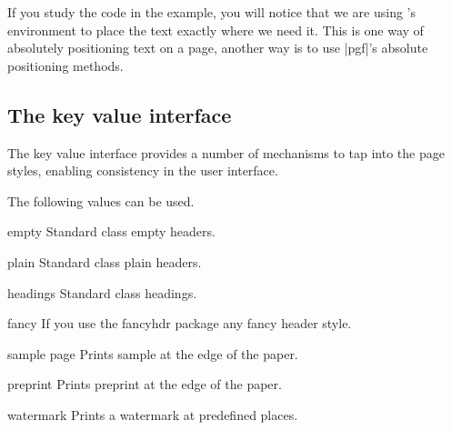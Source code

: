 If you study the code in the example, you will notice that we are using \LaTeXe's  environment to
place the text exactly where we need it. This is one way of absolutely positioning text on a page, another way is to use |pgf|’s absolute positioning methods.




\subsection{The key value interface}

The key value interface provides a number of mechanisms to tap into the page styles, enabling consistency in the user interface.

\medskip

 The following values can be used.

\begin{marglist}
\item [empty] Standard class empty headers.
\item [plain] Standard class plain headers.
\item [headings] Standard class headings.
\item [fancy] If you use the fancyhdr package any fancy header style.
\item [sample page] Prints sample at the edge of the paper.
\item [preprint] Prints preprint at the edge of the paper.
\item [watermark] Prints a watermark at predefined places.
\end{marglist}





